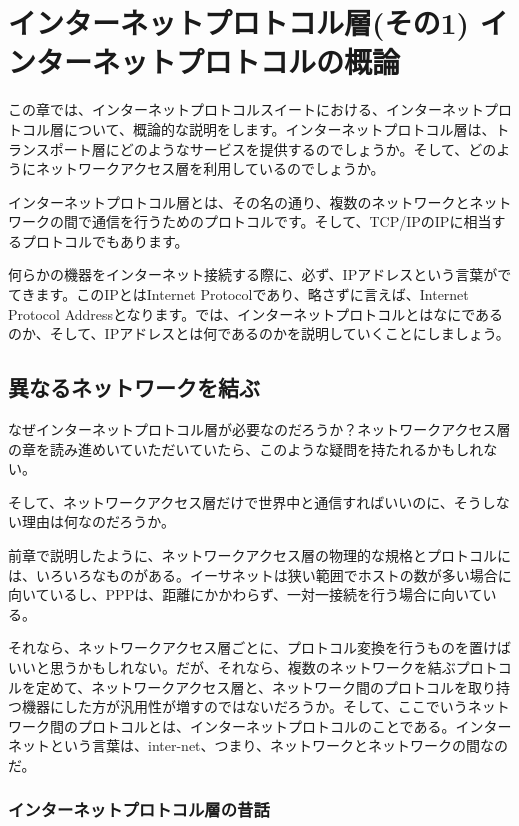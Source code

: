 \chapter{インターネットプロトコル層(その1) インターネットプロトコルの概論}

この章では、インターネットプロトコルスイートにおける、インターネットプロトコル層について、概論的な説明をします。インターネットプロトコル層は、トランスポート層にどのようなサービスを提供するのでしょうか。そして、どのようにネットワークアクセス層を利用しているのでしょうか。

インターネットプロトコル層とは、その名の通り、複数のネットワークとネットワークの間で通信を行うためのプロトコルです。そして、TCP/IPのIPに相当するプロトコルでもあります。

何らかの機器をインターネット接続する際に、必ず、IPアドレスという言葉がでてきます。このIPとはInternet Protocolであり、略さずに言えば、Internet Protocol Addressとなります。では、インターネットプロトコルとはなにであるのか、そして、IPアドレスとは何であるのかを説明していくことにしましょう。

\section{異なるネットワークを結ぶ}

なぜインターネットプロトコル層が必要なのだろうか？ネットワークアクセス層の章を読み進めいていただいていたら、このような疑問を持たれるかもしれない。

そして、ネットワークアクセス層だけで世界中と通信すればいいのに、そうしない理由は何なのだろうか。

前章で説明したように、ネットワークアクセス層の物理的な規格とプロトコルには、いろいろなものがある。イーサネットは狭い範囲でホストの数が多い場合に向いているし、PPPは、距離にかかわらず、一対一接続を行う場合に向いている。

それなら、ネットワークアクセス層ごとに、プロトコル変換を行うものを置けばいいと思うかもしれない。だが、それなら、複数のネットワークを結ぶプロトコルを定めて、ネットワークアクセス層と、ネットワーク間のプロトコルを取り持つ機器にした方が汎用性が増すのではないだろうか。そして、ここでいうネットワーク間のプロトコルとは、インターネットプロトコルのことである。インターネットという言葉は、inter-net、つまり、ネットワークとネットワークの間なのだ。

\subsection{インターネットプロトコル層の昔話}

